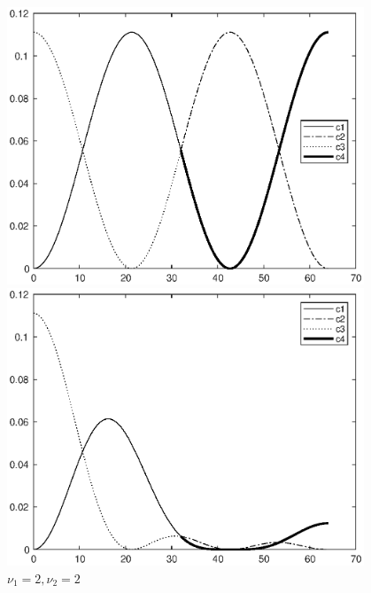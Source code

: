\documentclass[twoside,a4paper]{article}
\begin{document}
\begin{figure}[H]
    \begin{minipage}[t]{0.32\textwidth}
        \centering
        \includegraphics[width=0.95\textwidth]{figure/ex9_41_20.eps}
        \caption*{$\nu_1=2,\nu_2=0$}
    \end{minipage}
    \begin{minipage}[t]{0.32\textwidth}
        \centering
        \includegraphics[width=0.95\textwidth]{figure/ex9_41_22.eps}
        \caption*{$\nu_1=2,\nu_2=2$}
    \end{minipage}
    \begin{minipage}[t]{0.32\textwidth}
        \centering

\end{minipage}
\end{figure}
\end{document}
